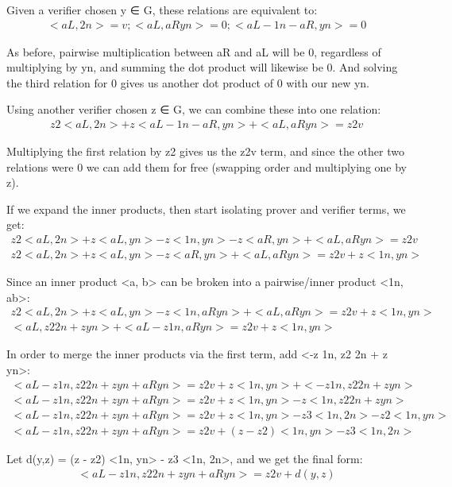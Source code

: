 \documentclass{article}
\begin{document}
Given a verifier chosen y ∈ G, these relations are equivalent to:
\begin{eqnarray}
  <aL, 2n> = v ; <aL,  aRyn> = 0 ; <aL - 1n - aR, yn> = 0
\end{eqnarray}

As before, pairwise multiplication between aR and aL will be 0, regardless of multiplying by yn, and summing the dot product will likewise be 0. And solving the third relation for 0 gives us another dot product of 0 with our new yn.

Using another verifier chosen z ∈ G, we can combine these into one relation:
\begin{eqnarray}
  z2 <aL, 2n> + z <aL - 1n - aR, yn> + <aL,  aRyn> = z2 v
\end{eqnarray}

Multiplying the first relation by z2 gives us the z2v term, and since the other two relations were 0 we can add them for free (swapping order and multiplying one by z).

If we expand the inner products, then start isolating prover and verifier terms, we get:
\begin{eqnarray}
  z2 <aL, 2n> + z <aL, yn> - z <1n, yn> - z <aR, yn> + <aL,  aRyn> = z2 v\\
  z2 <aL, 2n> + z <aL, yn> - z <aR, yn> + <aL,  aRyn> = z2 v + z <1n, yn>
\end{eqnarray}

Since an inner product <a, b> can be broken into a pairwise/inner product <1n, ab>:
\begin{eqnarray}
  z2 <aL, 2n> + z <aL, yn> - z <1n, aRyn> + <aL,  aRyn> = z2 v + z <1n, yn>\\
  <aL, z2 2n + z yn> + <aL - z 1n, aRyn> = z2 v + z <1n, yn>
\end{eqnarray}

In order to merge the inner products via the first term, add <-z 1n, z2 2n + z yn>:
\begin{eqnarray}
  <aL - z 1n, z2 2n + z yn + aRyn> = z2 v + z <1n, yn> + <-z 1n, z2 2n + z yn>\\
  <aL - z 1n, z2 2n + z yn + aRyn> = z2 v + z <1n, yn> - z <1n, z2 2n + z yn>\\
  <aL - z 1n, z2 2n + z yn + aRyn> = z2 v + z <1n, yn> - z3 <1n, 2n> - z2 <1n, yn>\\
  <aL - z 1n, z2 2n + z yn + aRyn> = z2 v + (z - z2) <1n, yn> - z3 <1n, 2n>
\end{eqnarray}
  
Let d(y,z) = (z - z2) <1n, yn> - z3 <1n, 2n>, and we get the final form:
\begin{eqnarray}
  <aL - z 1n, z2 2n + z yn + aRyn> = z2 v + d(y,z)
\end{eqnarray}
\end{document}

